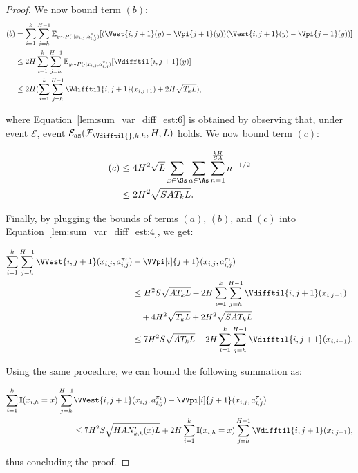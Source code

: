 \begin{proof}
We now bound term $(b)$:
\begin{align}
    (b) &= \sum_{i=1}^k \sum_{j=h}^{H-1} \mathbb{E}_{y \sim P (\cdot | x_{i,j}, a_{i,j}^{\pi_i})} [(\Vest{i,j+1}(y) + \Vpi{j+1}(y))(\Vest{i,j+1}(y) - \Vpi{j+1}(y))] \nonumber \\
    &\le 2H \sum_{i=1}^k \sum_{j=h}^{H-1} \mathbb{E}_{y \sim P (\cdot | x_{i,j}, a_{i,j}^{\pi_i})} [\Vdifftil{i,j+1}(y)] \nonumber \\
    &\le 2H(\sum_{i=1}^k \sum_{j=h}^{H-1} \Vdifftil{i,j+1}(x_{i,j+1}) + 2H \sqrt{T_k L}), \label{lem:sum_var_diff_est:6}
\end{align}

where Equation~\eqref{lem:sum_var_diff_est:6} is obtained by observing that, under event $\mathcal{E}$, event $\mathcal{E}_{\mathrm{az}}(\mathcal{F}_{\Vdifftil{}, k, h}, H, L)$ holds.
We now bound term $(c)$:

\begin{align*}
    (c) &\le 4 H^2 \sqrt{L} \sum_{x\in\Ss} \sum_{a\in\As} \sum_{n=1}^{\frac{kH}{SA}} n^{-1/2} \\
    &\le 2 H^2 \sqrt{S A T_k L}.
\end{align*}

Finally, by plugging the bounds of terms $(a)$, $(b)$, and $(c)$ into Equation~\eqref{lem:sum_var_diff_est:4}, we get:

\begin{align*}
    \sum_{i=1}^k \sum_{j=h}^{H-1} \VVest{i,j+1}(x_{i,j}, a_{i,j}^{\pi_i}) &- \VVpi[i]{j+1}(x_{i,j}, a_{i,j}^{\pi_i}) \\
    &\le H^2 S \sqrt{A T_k L} + 2H \sum_{i=1}^k \sum_{j=h}^{H-1} \Vdifftil{i,j+1}(x_{i,j+1}) \\
    &\quad + 4H^2 \sqrt{T_k L} + 2H^2 \sqrt{SAT_kL} \\
    &\le 7 H^2 S \sqrt{A T_k L} + 2H \sum_{i=1}^k \sum_{j=h}^{H-1} \Vdifftil{i,j+1}(x_{i,j+1}).
\end{align*}

Using the same procedure, we can bound the following summation as:

\begin{align*}
    \sum_{i=1}^k \mathbb{I}(x_{i,h}=x) \sum_{j=h}^{H-1} &\VVest{i,j+1}(x_{i,j}, a_{i,j}^{\pi_i}) - \VVpi[i]{j+1}(x_{i,j}, a_{i,j}^{\pi_i}) \\
    &\le 7 H^2 S \sqrt{H A N'_{k,h}(x) L} + 2H \sum_{i=1}^k \mathbb{I}(x_{i,h}=x) \sum_{j=h}^{H-1} \Vdifftil{i,j+1}(x_{i,j+1}),
\end{align*}

thus concluding the proof.
\end{proof}

